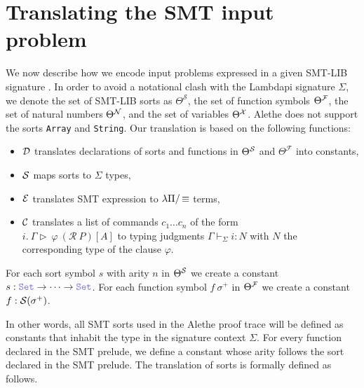 \section{Translating the SMT input problem}

We now describe how we encode input problems expressed in a given
SMT-LIB signature \cite[\S 5.2.1]{smtlib}. In order to avoid a notational clash with the Lambdapi signature $\Sigma$, we denote the set of SMT-LIB sorts as $\Theta^\mathcal{S}$, the set of function symbols $\Theta^\cal{F}$, the set of natural numbers $\Theta^\cal{N}$, and the set of variables $\Theta^\cal{X}$.
Alethe does not support the sorts \texttt{Array} and \texttt{String}. Our translation is based on the following functions:
\begin{itemize}
\item $\cal{D}$ translates declarations of sorts and functions in $\Theta^\cal{S}$ and $\Theta^\mathcal{F}$ into constants,
\item $\cal{S}$ maps sorts to $\Sigma$ types,
\item $\cal{E}$ translates SMT expression to $\lpm$ terms,
\item $\cal{C}$ translates a list of commands  $c_1 \dots c_n$ of the form\\
  $i.~\Gamma \triangleright~\varphi~(\mathcal{R}~P)[A]$ to typing judgments $\Gamma \vdash_\Sigma i : N$ with $N$ the corresponding type of the clause $\varphi$.
\end{itemize}

\smallskip

\begin{definition}
For each sort symbol $s$ with arity $n$ in $\Theta^\cal{S}$ we create a constant $s: \set \ra \dots \ra \set$.
For each function symbol $f~\sigma^+$ in $\Theta^\cal{F}$ we create a constant $f: \cal{S}(\sigma^+)$.
\end{definition}

\smallskip

In other words, all SMT sorts used in the Alethe proof trace will be defined as constants that inhabit the type \set{} in the signature context $\Sigma$.
For every function declared in the SMT prelude, we define a constant whose arity follows the sort declared in the SMT prelude. The translation of sorts is formally defined as follows.

\smallskip

